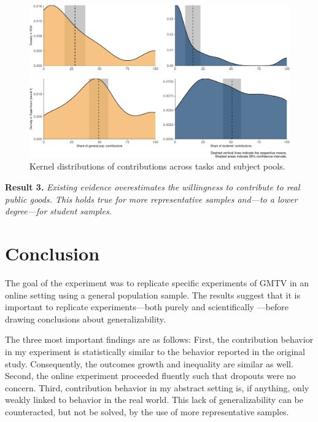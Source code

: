 \documentclass[
  authoryear,
  preprint,
  3p]{elsarticle}
\begin{document}
\begin{figure}

{\centering \includegraphics{paper_files/figure-pdf/fig-kernel-generalizability-1.pdf}

}

\caption{\label{fig-kernel-generalizability}Kernel distributions of
contributions across tasks and subject pools.}

\end{figure}

\textbf{Result 3.} \emph{Existing evidence overestimates the willingness
to contribute to real public goods. This holds true for more
representative samples and---to a lower degree---for student samples.}

\hypertarget{sec-conclusion}{%
\section{Conclusion}\label{sec-conclusion}}

The goal of the experiment was to replicate specific experiments of GMTV
in an online setting using a general population sample. The results
suggest that it is important to replicate experiments---both purely and
scientifically \citep[ p.~716]{Hamermesh2007}---before drawing
conclusions about generalizability.

The three most important findings are as follows: First, the
contribution behavior in my experiment is statistically similar to the
behavior reported in the original study. Consequently, the outcomes
growth and inequality are similar as well. Second, the online experiment
proceeded fluently such that dropouts were no concern. Third,
contribution behavior in my abstract setting is, if anything, only
weakly linked to behavior in the real world. This lack of
generalizability can be counteracted, but not be solved, by the use of
more representative samples.
\end{document}
